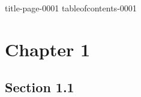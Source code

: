 \documentclass[a4paper,11pt]{book}
\begin{document}
\frontmatter 

{title-page-0001}
{tableofcontents-0001}

\mainmatter

\chapter{Chapter 1}
\section{Section 1.1}

\backmatter 

\end{document}
